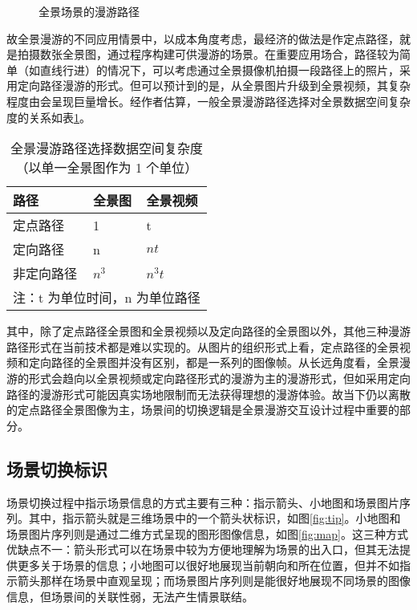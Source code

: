 \begin{figure}[htp]
\centering
{}
\caption{全景场景的漫游路径}
\label{fig:visual}
\end{figure}

故全景漫游的不同应用情景中，以成本角度考虑，最经济的做法是作定点路径，就是拍摄数张全景图，通过程序构建可供漫游的场景。在重要应用场合，路径较为简单（如直线行进）的情况下，可以考虑通过全景摄像机拍摄一段路径上的照片，采用定向路径漫游的形式。但可以预计到的是，从全景图片升级到全景视频，其复杂程度由会呈现巨量增长。经作者估算，一般全景漫游路径选择对全景数据空间复杂度的关系如表\ref{tab:complex}。

\begin{table}[htbp]
\centering
\caption{全景漫游路径选择数据空间复杂度\newline（以单一全景图作为 1 个单位）}
\vskip 5pt
\begin{tabular}{lll}
\toprule
路径 & 全景图 & 全景视频 \\
\midrule
定点路径 & 1 & t \\
定向路径  & n & $nt$ \\
非定向路径 & $n^3$ & $n^3t$ \\
\bottomrule
\multicolumn{3}{l}{\small 注：t 为单位时间，n 为单位路径}
\end{tabular}
\label{tab:complex}
\end{table}

其中，除了定点路径全景图和全景视频以及定向路径的全景图以外，其他三种漫游路径形式在当前技术都是难以实现的。从图片的组织形式上看，定点路径的全景视频和定向路径的全景图并没有区别，都是一系列的图像帧。从长远角度看，全景漫游的形式会趋向以全景视频或定向路径形式的漫游为主的漫游形式，但如采用定向路径的漫游形式可能因真实场地限制而无法获得理想的漫游体验。故当下仍以离散的定点路径全景图像为主，场景间的切换逻辑是全景漫游交互设计过程中重要的部分。

\subsection{场景切换标识}
场景切换过程中指示场景信息的方式主要有三种：指示箭头、小地图和场景图片序列。其中，指示箭头就是三维场景中的一个箭头状标识，如图\ref{fig:tip}。小地图和场景图片序列则是通过二维方式呈现的图形图像信息，如图\ref{fig:map}。这三种方式优缺点不一：箭头形式可以在场景中较为方便地理解为场景的出入口，但其无法提供更多关于场景的信息；小地图可以很好地展现当前朝向和所在位置，但并不如指示箭头那样在场景中直观呈现；而场景图片序列则是能很好地展现不同场景的图像信息，但场景间的关联性弱，无法产生情景联结。

